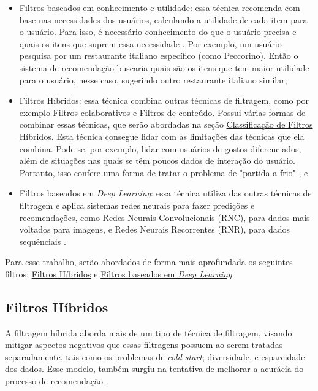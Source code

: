 \begin{itemize}
\item Filtros baseados em conhecimento e utilidade: essa técnica recomenda com base nas necessidades dos usuários, 
calculando a utilidade de cada item para o usuário. Para isso, é necessário conhecimento do que o usuário precisa e 
quais os itens que suprem essa necessidade \cite{burke2002hybrid}. Por exemplo, um usuário pesquisa por um restaurante
italiano específico (como Peccorino). Então o sistema de recomendação buscaria quais são os itens que tem maior utilidade para 
o usuário, nesse caso, sugerindo outro restaurante italiano similar;

\item Filtros Híbridos: essa técnica combina outras técnicas de filtragem, como por exemplo Filtros colaborativos e Filtros
de conteúdo. Possui várias formas de combinar essas técnicas, que serão abordadas na seção 
\hyperref[subsubsec:tiposfh]{Classificação de Filtros Híbridos}. Esta técnica consegue lidar com as limitações das técnicas que 
ela combina. Pode-se, por exemplo, lidar com usuários de gostos diferenciados, além de situações nas quais se
têm poucos dados de interação do usuário. Portanto, isso confere uma forma de tratar o problema de 
"partida a frio" \cite{stratoflow-recommendation}, e 

\item Filtros baseados em \textit{Deep Learning}: essa técnica utiliza das outras técnicas de filtragem e 
aplica sistemas redes neurais para fazer predições e recomendações, 
como Redes Neurais Convolucionais (RNC), para dados mais voltados para imagens, e Redes Neurais Recorrentes (RNR), para dados
sequênciais \cite{nvidia-recommendation}.
\end{itemize}

Para esse trabalho, serão abordados de forma mais aprofundada os seguintes filtros:
\hyperref[subsec:hibridos]{Filtros Híbridos} e \hyperref[subsec:filtrodeep]{Filtros baseados em \textit{Deep Learning}}.

\subsection{Filtros Híbridos}\label{subsec:hibridos}
A filtragem híbrida aborda mais de um tipo de técnica de filtragem, visando mitigar aspectos negativos que essas filtragens
possuem ao serem tratadas separadamente, tais como os problemas de \textit{cold start}; diversidade, e esparcidade dos dados. 
Esse modelo, também surgiu
na tentativa de melhorar a acurácia do processo de recomendação \cite{thorat2015survey}.

